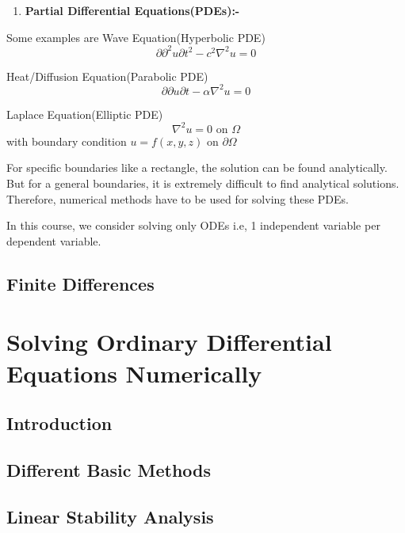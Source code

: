 \documentclass[
]{book}
\providecommand{\tightlist}{%
  \setlength{\itemsep}{0pt}\setlength{\parskip}{0pt}}
\begin{document}
\begin{enumerate}
  \begin{enumerate}
  \def\labelenumii{\alph{enumii}.}
  \setcounter{enumii}{1}
  \tightlist
  \item
    \textbf{Partial Differential Equations(PDEs):-}
  \end{enumerate}

  Some examples are Wave Equation(Hyperbolic PDE)
  \[\partial{\partial^2 u}{\partial t^2}-c^2 \nabla^2 u= 0\]

  Heat/Diffusion Equation(Parabolic PDE)
  \[\partial{\partial u}{\partial t}-\alpha \nabla^2 u= 0\]

  Laplace Equation(Elliptic PDE)
  \[\nabla^2 u = 0 \text{ on } \Omega\]
  with boundary condition \(u = f(x,y,z)\) on \(\partial \Omega\)

  For specific boundaries like a rectangle, the solution can be found analytically. But for a general boundaries, it is extremely difficult to find analytical solutions. Therefore, numerical methods have to be used for solving these PDEs.
\end{enumerate}

In this course, we consider solving only ODEs i.e, 1 independent variable per dependent variable.

\hypertarget{finite-differences}{%
\section{Finite Differences}\label{finite-differences}}

\hypertarget{solving-ordinary-differential-equations-numerically}{%
\chapter{Solving Ordinary Differential Equations Numerically}\label{solving-ordinary-differential-equations-numerically}}

\hypertarget{introduction-2}{%
\section{Introduction}\label{introduction-2}}

\hypertarget{different-basic-methods}{%
\section{Different Basic Methods}\label{different-basic-methods}}

\hypertarget{linear-stability-analysis}{%
\section{Linear Stability Analysis}\label{linear-stability-analysis}}
\end{document}
